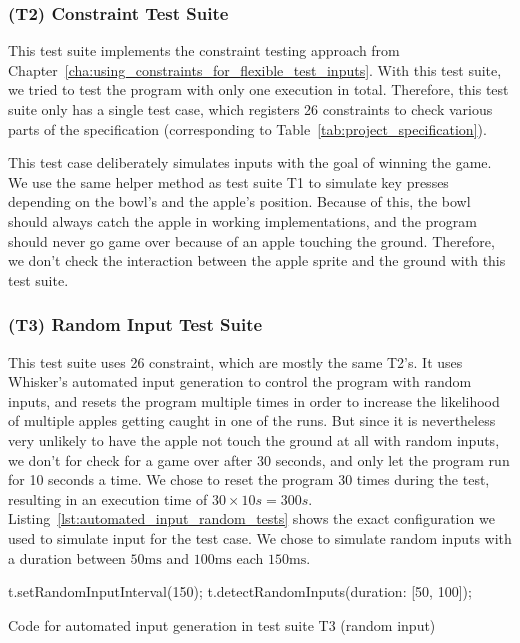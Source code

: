 \subsubsection{(T2) Constraint Test Suite}

This test suite implements the constraint testing approach from Chapter~\ref{cha:using_constraints_for_flexible_test_inputs}.
With this test suite, we tried to test the program with only one execution in total.
Therefore, this test suite only has a single test case, which registers 26 constraints to check various parts of the specification
(corresponding to Table~\ref{tab:project_specification}).
\parspace

This test case deliberately simulates inputs with the goal of winning the game.
We use the same helper method as test suite T1 to simulate key presses depending on the bowl's and the apple's position.
Because of this, the bowl should always catch the apple in working implementations,
and the program should never go game over because of an apple touching the ground.
Therefore, we don't check the interaction between the apple sprite and the ground with this test suite.

\subsubsection{(T3) Random Input Test Suite}

This test suite uses 26 constraint, which are mostly the same T2's.
It uses Whisker's automated input generation to control the program with random inputs,
and resets the program multiple times in order to increase the likelihood of multiple apples getting caught in one of the runs.
But since it is nevertheless very unlikely to have the apple not touch the ground at all with random inputs,
we don't for check for a game over after 30 seconds, and only let the program run for 10 seconds a time.
We chose to reset the program 30 times during the test, resulting in an execution time of $30 \times 10s = 300s$.
Listing~\ref{lst:automated_input_random_tests} shows the exact configuration we used to simulate input for the test case.
We chose to simulate random inputs with a duration between $50\text{ms}$ and $100\text{ms}$ each $150\text{ms}$.
\parspace

\begin{listing}[htpb]
    \centering
    \begin{minipage}{.55\textwidth}
        \begin{javascriptcode}
            t.setRandomInputInterval(150);
            t.detectRandomInputs({duration: [50, 100]});
        \end{javascriptcode}
    \end{minipage}
    \caption{Code for automated input generation in test suite T3 (random input)}
    \label{lst:automated_input_random_tests}
\end{listing}

